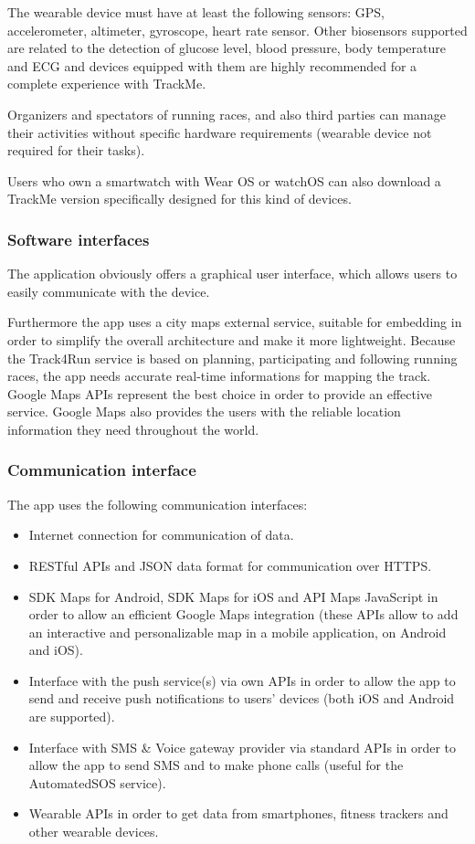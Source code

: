 The wearable device must have at least the following sensors: GPS, accelerometer, altimeter, gyroscope, heart rate sensor. Other biosensors supported are related to the detection of glucose level, blood pressure, body temperature and ECG and devices equipped with them are highly recommended for a complete experience with TrackMe.

Organizers and spectators of running races, and also third parties can manage their activities without specific hardware requirements (wearable device not required for their tasks).

Users who own a smartwatch with Wear OS or watchOS can also download a TrackMe version specifically designed for this kind of devices.

\subsubsection{Software interfaces}
The application obviously offers a graphical user interface, which allows users to easily communicate with the device.

Furthermore the app uses a city maps external service, suitable for embedding in order to simplify the overall architecture and make it more lightweight. Because the Track4Run service is based on planning, participating and following running races, the app needs accurate real-time informations for mapping the track. Google Maps APIs represent the best choice in order to provide an effective service. Google Maps also provides the users with the reliable location information they need throughout the world.

\subsubsection{Communication interface}
The app uses the following communication interfaces:
\begin{itemize}
\item Internet connection for communication of data.
\item RESTful APIs and JSON data format for communication over HTTPS.
\item SDK Maps for Android, SDK Maps for iOS and API Maps JavaScript in order to allow an efficient Google Maps integration (these APIs allow to add an interactive and personalizable map in a mobile application, on Android and iOS).
\item Interface with the push service(s) via own APIs in order to allow the app to send and receive push notifications to users' devices (both iOS and Android are supported).
\item Interface with SMS \& Voice gateway provider via standard APIs in order to allow the app to send SMS and to make phone calls (useful for the AutomatedSOS service).
\item Wearable APIs in order to get data from smartphones, fitness trackers and other wearable devices.
\end{itemize}

